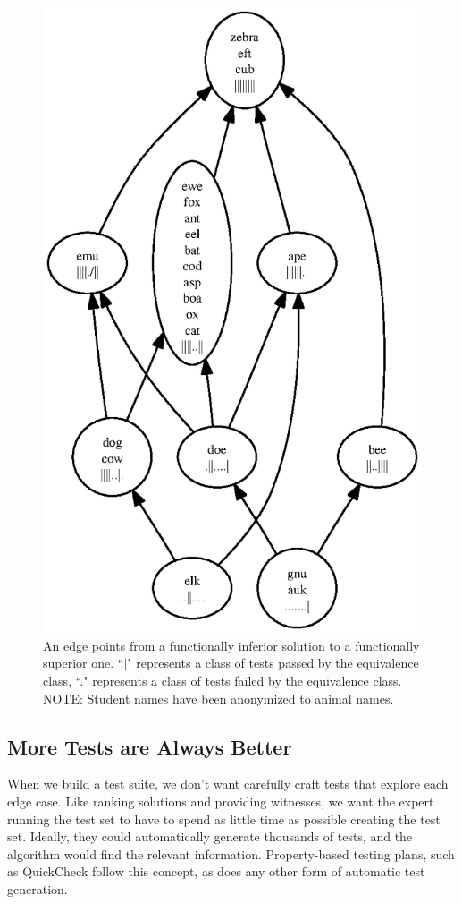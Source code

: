 \documentclass[11pt,twoside]{article}
\theoremstyle{definition}
\let\cite=\citep
\begin{document}
\begin{figure}
\centering
\includegraphics{rank1.ps}
\caption{An edge points from a functionally inferior solution to a functionally superior one. ``$\vert$" represents a class of tests passed by the equivalence class, ``." represents a class of tests failed by the equivalence class. NOTE: Student names have been anonymized to animal names.}
\end{figure}

\subsection{More Tests are Always Better}
When we build a test suite, we don't want carefully craft tests that explore each edge case. Like ranking solutions and providing witnesses, we want the expert running the test set to have to spend as little time as possible creating the test set. Ideally, they could automatically generate thousands of tests, and the algorithm would find the relevant information. Property-based testing plans, such as QuickCheck \cite{QuickCheck} follow this concept, as does any other form of automatic test generation.
\end{document}
